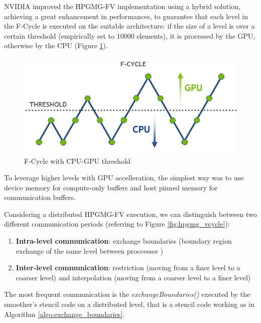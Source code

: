 \documentclass[review]{siamart1116}
\begin{document}
NVIDIA improved the HPGMG-FV implementation \cite{HPGMG_NVIDIA} using a hybrid solution, achieving a great enhancement in performances, to guarantee that each level in the F-Cycle is executed on the suitable architecture: if the size of a level is over a certain threshold (empirically set to 10000 elements), it is processed by the GPU, otherwise by the CPU (Figure \ref{fig:hpgmg_fcycle}).

\begin{figure}[h]
\centering
\includegraphics[scale=0.6]{hpgmg_f_cycle.png}
\caption{F-Cycle with CPU-GPU threshold}
\label{fig:hpgmg_fcycle}
\end{figure}

To leverage higher levels with GPU accelleration, the simplest way was to use device memory for compute-only buffers and host pinned memory for communication buffers.

Considering a distributed HPGMG-FV execution, we can distinguish between two different communication periods (referring to Figure \ref{fig:hpgmg_vcycle}):
\begin{enumerate}
\item \textbf{Intra-level communication}: exchange boundaries (boundary region exchange of the same level between proccesses )
\item \textbf{Inter-level communication}: restriction (moving from a finer level to a coarser level) and interpolation (moving from a coarser level to a finer level)
\end{enumerate}

The most frequent communication is the \emph{exchangeBoundaries()} executed by the smoother's
stencil code on a distributed level, that is a stencil code working as in Algorithm
\ref{algo:exchange_boundaries}.
\end{document}
